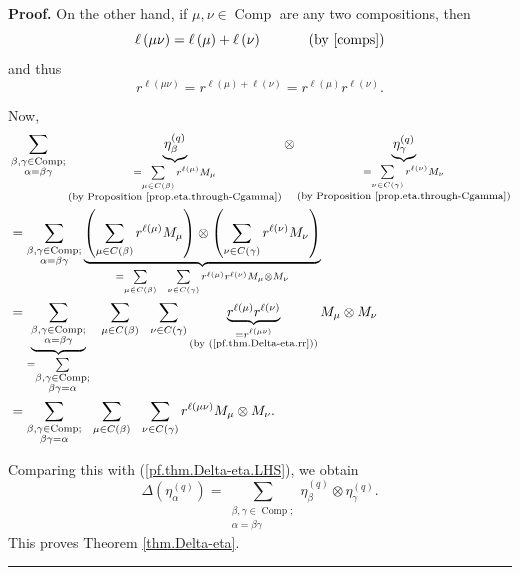 \documentclass[numbers=enddot,12pt,final,onecolumn,notitlepage]{scrartcl}%
\theoremstyle{definition}
\newenvironment{proof}[1][Proof]{\noindent\textbf{#1.} }{\ \rule{0.5em}{0.5em}}
\let\sumnonlimits\sum
\renewcommand{\sum}{\sumnonlimits\limits}
\begin{document}
\begin{proof}
On the other hand, if $\mu,\nu\in\operatorname*{Comp}$ are any two
compositions, then%
\[
\ell\left(  \mu\nu\right)  =\ell\left(  \mu\right)  +\ell\left(  \nu\right)
\ \ \ \ \ \ \ \ \ \ \left(  \text{by \cite[Proposition 5.2 \textbf{(a)}%
]{comps}}\right)
\]
and thus%
\begin{equation}
r^{\ell\left(  \mu\nu\right)  }=r^{\ell\left(  \mu\right)  +\ell\left(
\nu\right)  }=r^{\ell\left(  \mu\right)  }r^{\ell\left(  \nu\right)  }.
\label{pf.thm.Delta-eta.rr}%
\end{equation}


Now,%
\begin{align*}
&  \sum_{\substack{\beta,\gamma\in\operatorname*{Comp};\\\alpha=\beta\gamma
}}\underbrace{\eta_{\beta}^{\left(  q\right)  }}_{\substack{=\sum_{\mu\in
C\left(  \beta\right)  }r^{\ell\left(  \mu\right)  }M_{\mu}\\\text{(by
Proposition \ref{prop.eta.through-Cgamma})}}}\otimes\underbrace{\eta_{\gamma
}^{\left(  q\right)  }}_{\substack{=\sum_{\nu\in C\left(  \gamma\right)
}r^{\ell\left(  \nu\right)  }M_{\nu}\\\text{(by Proposition
\ref{prop.eta.through-Cgamma})}}}\\
&  =\sum_{\substack{\beta,\gamma\in\operatorname*{Comp};\\\alpha=\beta\gamma
}}\underbrace{\left(  \sum_{\mu\in C\left(  \beta\right)  }r^{\ell\left(
\mu\right)  }M_{\mu}\right)  \otimes\left(  \sum_{\nu\in C\left(
\gamma\right)  }r^{\ell\left(  \nu\right)  }M_{\nu}\right)  }_{=\sum_{\mu\in
C\left(  \beta\right)  }\ \ \sum_{\nu\in C\left(  \gamma\right)  }%
r^{\ell\left(  \mu\right)  }r^{\ell\left(  \nu\right)  }M_{\mu}\otimes M_{\nu
}}\\
&  =\underbrace{\sum_{\substack{\beta,\gamma\in\operatorname*{Comp}%
;\\\alpha=\beta\gamma}}}_{=\sum_{\substack{\beta,\gamma\in\operatorname*{Comp}%
;\\\beta\gamma=\alpha}}}\ \ \sum_{\mu\in C\left(  \beta\right)  }\ \ \sum
_{\nu\in C\left(  \gamma\right)  }\underbrace{r^{\ell\left(  \mu\right)
}r^{\ell\left(  \nu\right)  }}_{\substack{=r^{\ell\left(  \mu\nu\right)
}\\\text{(by (\ref{pf.thm.Delta-eta.rr}))}}}M_{\mu}\otimes M_{\nu}\\
&  =\sum_{\substack{\beta,\gamma\in\operatorname*{Comp};\\\beta\gamma=\alpha
}}\ \ \sum_{\mu\in C\left(  \beta\right)  }\ \ \sum_{\nu\in C\left(
\gamma\right)  }r^{\ell\left(  \mu\nu\right)  }M_{\mu}\otimes M_{\nu}.
\end{align*}


Comparing this with (\ref{pf.thm.Delta-eta.LHS}), we obtain%
\[
\Delta\left(  \eta_{\alpha}^{\left(  q\right)  }\right)  =\sum
_{\substack{\beta,\gamma\in\operatorname*{Comp};\\\alpha=\beta\gamma}%
}\eta_{\beta}^{\left(  q\right)  }\otimes\eta_{\gamma}^{\left(  q\right)  }.
\]
This proves Theorem \ref{thm.Delta-eta}.
\end{proof}
\end{document}
